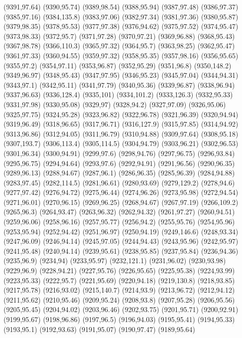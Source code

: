 (9391,97.64)
(9390,95.74)
(9389,98.54)
(9388,95.94)
(9387,97.48)
(9386,97.37)
(9385,97.16)
(9384,135.8)
(9383,97.06)
(9382,97.34)
(9381,97.36)
(9380,95.87)
(9379,98.35)
(9378,95.53)
(9377,97.38)
(9376,94.62)
(9375,97.52)
(9374,95.47)
(9373,98.33)
(9372,95.7)
(9371,97.28)
(9370,97.21)
(9369,96.88)
(9368,95.43)
(9367,98.78)
(9366,110.3)
(9365,97.32)
(9364,95.7)
(9363,98.25)
(9362,95.47)
(9361,97.33)
(9360,94.55)
(9359,97.32)
(9358,95.35)
(9357,98.16)
(9356,95.65)
(9355,97.2)
(9354,97.11)
(9353,96.87)
(9352,95.29)
(9351,96.8)
(9350,148.2)
(9349,96.97)
(9348,95.43)
(9347,97.95)
(9346,95.23)
(9345,97.04)
(9344,94.31)
(9343,97.1)
(9342,95.11)
(9341,97.79)
(9340,95.36)
(9339,96.87)
(9338,96.94)
(9337,96.63)
(9336,128.4)
(9335,101)
(9334,101.2)
(9333,126.3)
(9332,95.33)
(9331,97.98)
(9330,95.08)
(9329,97)
(9328,94.2)
(9327,97.09)
(9326,95.06)
(9325,97.75)
(9324,95.28)
(9323,96.82)
(9322,96.78)
(9321,96.39)
(9320,94.94)
(9319,96.49)
(9318,96.65)
(9317,96.71)
(9316,127.9)
(9315,97.85)
(9314,94.92)
(9313,96.86)
(9312,94.05)
(9311,96.79)
(9310,94.88)
(9309,97.64)
(9308,95.18)
(9307,193.7)
(9306,113.4)
(9305,114.5)
(9304,94.79)
(9303,96.21)
(9302,96.53)
(9301,96.34)
(9300,94.91)
(9299,97.6)
(9298,94.76)
(9297,96.75)
(9296,93.84)
(9295,96.75)
(9294,94.64)
(9293,97.6)
(9292,94.91)
(9291,96.56)
(9290,96.35)
(9289,96.13)
(9288,94.67)
(9287,96.1)
(9286,96.35)
(9285,96.39)
(9284,94.88)
(9283,97.45)
(9282,114.5)
(9281,96.61)
(9280,93.69)
(9279,129.2)
(9278,94.6)
(9277,97.42)
(9276,94.72)
(9275,96.44)
(9274,96.26)
(9273,95.98)
(9272,94.54)
(9271,96.01)
(9270,96.15)
(9269,96.25)
(9268,94.67)
(9267,97.19)
(9266,109.2)
(9265,96.3)
(9264,93.47)
(9263,96.32)
(9262,94.32)
(9261,97.27)
(9260,94.51)
(9259,96.06)
(9258,96.16)
(9257,95.77)
(9256,94.2)
(9255,95.76)
(9254,95.96)
(9253,95.94)
(9252,94.42)
(9251,96.97)
(9250,94.19)
(9249,146.6)
(9248,93.34)
(9247,96.09)
(9246,94.14)
(9245,97.05)
(9244,94.43)
(9243,95.96)
(9242,95.97)
(9241,95.48)
(9240,94.14)
(9239,95.61)
(9238,95.85)
(9237,95.84)
(9236,94.36)
(9235,96.9)
(9234,94)
(9233,95.97)
(9232,121.1)
(9231,96.02)
(9230,93.98)
(9229,96.9)
(9228,94.21)
(9227,95.76)
(9226,95.65)
(9225,95.38)
(9224,93.99)
(9223,95.33)
(9222,95.7)
(9221,95.69)
(9220,94.18)
(9219,130.8)
(9218,93.85)
(9217,95.78)
(9216,93.02)
(9215,140.7)
(9214,93.9)
(9213,96.72)
(9212,94.12)
(9211,95.62)
(9210,95.46)
(9209,95.24)
(9208,93.8)
(9207,95.28)
(9206,95.56)
(9205,95.45)
(9204,94.02)
(9203,96.46)
(9202,93.75)
(9201,95.71)
(9200,92.91)
(9199,95.67)
(9198,96.86)
(9197,96.5)
(9196,94.03)
(9195,95.41)
(9194,95.33)
(9193,95.1)
(9192,93.63)
(9191,95.07)
(9190,97.47)
(9189,95.64)
